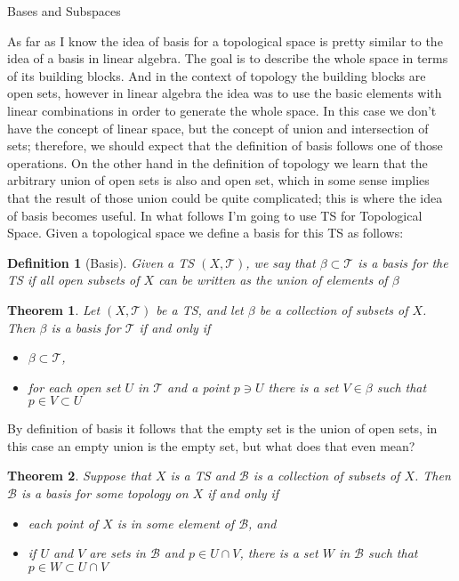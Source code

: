 \documentclass[12pt]{article}
\newtheorem{definition}{Definition}
\newtheorem{theorem}{Theorem}
\begin{document}
\begin{section}{Bases and Subspaces}

As far as I know the idea of basis for a topological space is pretty similar to the idea of a basis in linear algebra. The goal is to describe the whole space in terms of its building blocks. And in the context of topology the building blocks are open sets, however in linear algebra the idea was to use the basic elements with linear combinations in order to generate the whole space. In this case we don't have the concept of linear space, but the concept of union and intersection of sets; therefore, we should expect that the definition of basis follows one of those operations.
On the other hand in the definition of topology we learn that the arbitrary union of open sets is also and open set, which in some sense implies that the result of those union could be quite complicated; this is where the idea of basis becomes useful.
In what follows I'm going to use TS for Topological Space. Given a topological space we define a basis for this TS as follows:

\begin{definition}[Basis]
Given a TS $\left( X, \mathcal{T}\right)$, we say that $\mathcal{\beta}\subset\mathcal{T}$ is a basis for the TS if all open subsets of $X$ can be written as the union of elements of $\mathcal{\beta}$
\end{definition}

\begin{theorem}
Let $\left( X, \mathcal{T}\right)$ be a TS, and let $\mathcal{\beta}$ be a collection of subsets of $X$. Then $\mathcal{\beta}$ is a basis for $\mathcal{T}$ if and only if
	\begin{itemize}
		\item $\mathcal{\beta}\subset\mathcal{T}$,
		\item for each open set $U$ in $\mathcal{T}$ and a point $p\ni U$ there is a set $V\in\mathcal{\beta}$ such that $p\in V\subset U$
	\end{itemize}
\end{theorem}

\begin{tcolorbox}
By definition of basis it follows that the empty set is the union of open sets, in this case an empty union is the empty set, but what does that even mean?
\end{tcolorbox}

\begin{theorem}
Suppose that $X$ is a TS and $\mathcal{B}$ is a collection of subsets of $X$. Then $\mathcal{B}$ is a basis for some topology on $X$ if and only if 
	\begin{itemize}
		\item each point of $X$ is in some element of $\mathcal{B}$, and
		\item if $U$ and $V$ are sets in $\mathcal{B}$ and $p\in U\cap V$, there is a set $W$ in $\mathcal{B}$ such that $p\in W\subset U\cap V$
	\end{itemize}
\end{theorem}


\end{section}
\end{document}
